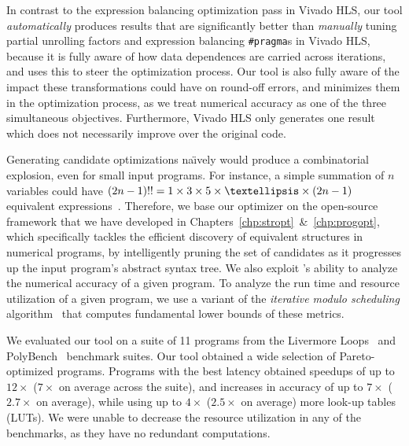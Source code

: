 In contrast to the expression balancing optimization pass in Vivado HLS,
our tool \emph{automatically} produces results that are significantly
better than \emph{manually} tuning partial unrolling factors and expression
balancing \verb|#pragma|s in Vivado HLS, because it is fully aware of how
data dependences are carried across iterations, and uses this to steer the
optimization process.  Our tool is also fully aware of the impact these
transformations could have on round-off errors, and minimizes them in the
optimization process, as we treat numerical accuracy as one of the three
simultaneous objectives.  Furthermore, Vivado HLS only generates one result
which does not necessarily improve over the original code.

Generating candidate optimizations na{\"\i}vely would produce a combinatorial
explosion, even for small input programs.  For instance, a simple summation of
$n$ variables could have $(2n - 1)!! = 1 \times 3 \times 5 \times \textellipsis
\times (2n - 1)$ equivalent expressions~\cite{mouilleron}.  Therefore, we base
our optimizer on the open-source \SOAP{} framework that we have developed in
Chapters~\ref{chp:stropt}~\&~\ref{chp:progopt}, which specifically tackles
the efficient discovery of equivalent structures in numerical programs,
by intelligently pruning the set of candidates as it progresses up the
input program's abstract syntax tree.  We also exploit \SOAP{}'s ability
to analyze the numerical accuracy of a given program.  To analyze the run
time and resource utilization of a given program, we use a variant of the
\emph{iterative modulo scheduling} algorithm~\cite{rau94} that computes
fundamental lower bounds of these metrics.

We evaluated our tool on a suite of 11 programs from the Livermore
Loops~\cite{livermore} and PolyBench~\cite{polybench} benchmark suites.  Our
tool obtained a wide selection of Pareto-optimized programs.  Programs with
the best latency obtained speedups of up to $12\times$ ($7\times$ on average
across the suite), and increases in accuracy of up to $7\times$ ($2.7\times$
on average), while using up to $4\times$ ($2.5\times$ on average) more look-up
tables (LUTs).  We were unable to decrease the resource utilization in any of
the benchmarks, as they have no redundant computations.

